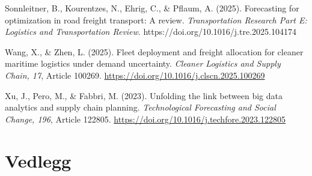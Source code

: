 \documentclass[a4paper,11pt]{article}
\begin{document}
Sonnleitner, B., Kourentzes, N., Ehrig, C., \& Pflaum, A. (2025). Forecasting for optimization in road freight transport: A review. \textit{Transportation Research Part E: Logistics and Transportation Review}. https://doi.org/10.1016/j.tre.2025.104174

Wang, X., \& Zhen, L. (2025). Fleet deployment and freight allocation for cleaner maritime logistics under demand uncertainty. \textit{Cleaner Logistics and Supply Chain, 17}, Article 100269. \href{https://doi.org/10.1016/j.clscn.2025.100269}{https://doi.org/10.1016/j.clscn.2025.100269}

Xu, J., Pero, M., \& Fabbri, M. (2023). Unfolding the link between big data analytics and supply chain planning. \textit{Technological Forecasting and Social Change, 196}, Article 122805. \href{https://doi.org/10.1016/j.techfore.2023.122805}{https://doi.org/10.1016/j.techfore.2023.122805} 

\section{Vedlegg}
\end{document}
